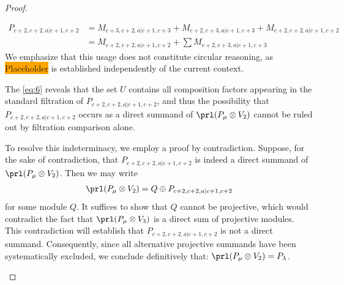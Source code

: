 \begin{proof}
\begin{enumerate}
\begin{enumerate}
\begin{enumerate}
\begin{equation}\label{eq:6}
  \begin{aligned}
    P_{c+2,c+2,a|c+1,c+2} &=
M_{c+3,c+2,a|c+1,c+3}
+M_{c+2,c+3,a|c+1,c+3}
+M_{c+2,c+2,a|c+1,c+2}\\
                          &=
 M_{c+2,c+2,a|c+1,c+2}
+\sum M_{c+2,c+3,a|c+1,c+3}
  \end{aligned}
\end{equation}
We emphasize that this usage does not constitute circular reasoning, as \colorbox{orange}{Placeholder} is established independently of the current context.

The \cref{eq:6} reveals that the set $U$ contains all composition factors appearing in the standard filtration of $P_{c+2,c+2,a|c+1,c+2}$, and thus the possibility that $P_{c+2,c+2,a|c+1,c+2}$ occurs as a direct summand of $\prl(P_\mu \otimes V_2)$ cannot be ruled out by filtration comparison alone.

To resolve this indeterminacy, we employ a proof by contradiction. Suppose, for the sake of contradiction, that $P_{c+2,c+2,a|c+1,c+2}$ is indeed a direct summand of $\prl(P_\mu \otimes V_2)$. Then we may write
\begin{equation}\notag
  \begin{aligned}
\prl(P_\mu \otimes V_2) = Q \oplus P_{c+2,c+2,a|c+1,c+2}
  \end{aligned}
\end{equation}
for some module $Q$. It suffices to show that $Q$ cannot be projective, which would contradict the fact that $\prl(P_\mu \otimes V_3)$ is a direct sum of projective modules. This contradiction will establish that $P_{c+2,c+2,a|c+1,c+2}$ is not a direct summand. Consequently, since all alternative projective summands have been systematically excluded, we conclude definitively that: $\prl(P_\mu \otimes V_2) = P_\lambda$.


\end{enumerate}
\end{enumerate}
\end{enumerate}
\end{proof}

